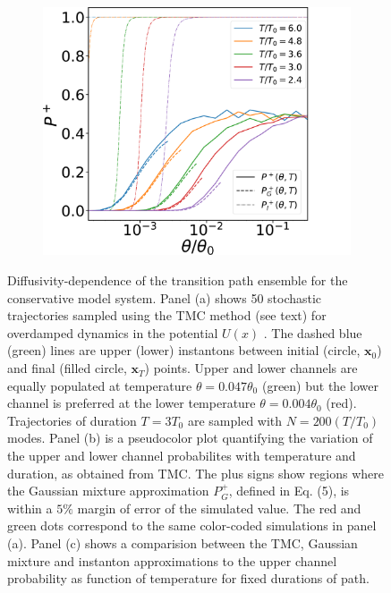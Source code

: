 \begin{figure}
\begin{subfigure}[b]{0.33\textwidth}
        \caption[]%
        {}    
    \end{subfigure}    
    \hfill
    \begin{subfigure}[b]{0.314\textwidth}
        \centering
        \includegraphics[width=\textwidth]{figs_part1/mcmc/switch_channel_rates_line_plot}
        \caption[]%
        {}    
    \end{subfigure}    
    
    \caption[ The average and standard deviation of critical parameters ]
    {\small Diffusivity-dependence of the transition path ensemble for the conservative
model system. Panel (a) shows 50 stochastic trajectories sampled using
the TMC method (see text) for overdamped dynamics in the potential
$U(x)$ \citep{note:SI}. The dashed blue (green) lines are upper
(lower) instantons between initial (circle, $\mathbf{x}_{0}$) and
final (filled circle, $\mathbf{x}_{T}$) points. Upper and lower channels
are equally populated at temperature $\theta=0.047\theta_{0}$ (green)
but the lower channel is preferred at the lower temperature $\theta=0.004\theta_{0}$
(red). Trajectories of duration $T=3T_{0}$ are sampled with $N=200(T/T_{0})$
modes. Panel (b) is a pseudocolor plot quantifying the variation of
the upper and lower channel probabilites with temperature and duration,
as obtained from TMC. The plus signs show regions where the Gaussian
mixture approximation $P_{G}^{+}$, defined in Eq. (5), is within
a $5\%$ margin of error of the simulated value. The red and green
dots correspond to the same color-coded simulations in panel (a).
Panel (c) shows a comparision between the TMC, Gaussian mixture and
instanton approximations to the upper channel probability as function
of temperature for fixed durations of path.} 
    \label{fig:switch}
\end{figure} 

